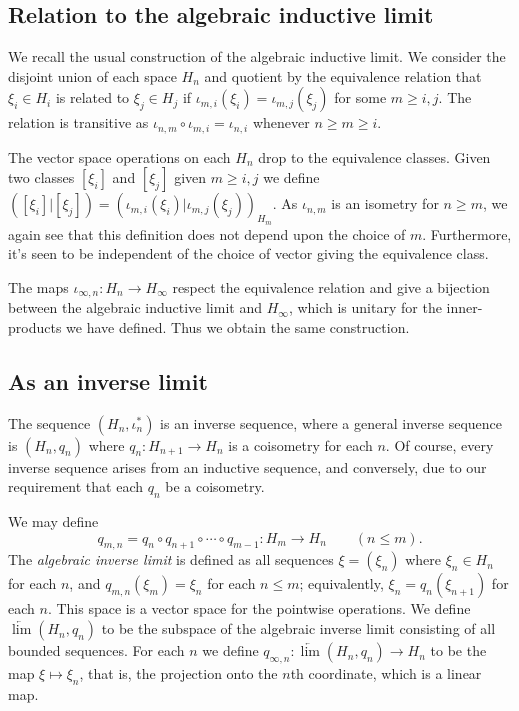 \documentclass[twoside,a4paper,12pt]{article}
\theoremstyle{plain}
\theoremstyle{definition}
\begin{document}
\subsection{Relation to the algebraic inductive limit}

We recall the usual construction of the algebraic inductive limit.  We consider the disjoint union of each space $H_n$ and quotient by the equivalence relation that $\xi_i\in H_i$ is related to $\xi_j\in H_j$ if $\iota_{m,i}(\xi_i) = \iota_{m,j}(\xi_j)$ for some $m\geq i,j$.  The relation is transitive as $\iota_{n,m}\circ\iota_{m,i} = \iota_{n,i}$ whenever $n \geq m \geq i$.

The vector space operations on each $H_n$ drop to the equivalence classes.  Given two classes $[\xi_i]$ and $[\xi_j]$ given $m\geq i,j$ we define $([\xi_i]|[\xi_j]) = (\iota_{m,i}(\xi_i)|\iota_{m,j}(\xi_j))_{H_m}$.  As $\iota_{n,m}$ is an isometry for $n\geq m$, we again see that this definition does not depend upon the choice of $m$.  Furthermore, it's seen to be independent of the choice of vector giving the equivalence class.

The maps $\iota_{\infty,n} \colon H_n \to H_\infty$ respect the equivalence relation and give a bijection between the algebraic inductive limit and $H_\infty$, which is unitary for the inner-products we have defined.  Thus we obtain the same construction.


\subsection{As an inverse limit}

The sequence $(H_n, \iota_n^*)$ is an inverse sequence, where a general inverse sequence is $(H_n, q_n)$ where $q_n\colon H_{n+1} \to H_n$ is a coisometry for each $n$.  Of course, every inverse sequence arises from an inductive sequence, and conversely, due to our requirement that each $q_n$ be a coisometry.

We may define
\[ q_{m,n} = q_n \circ q_{n+1} \circ\cdots\circ q_{m-1} \colon H_m \to H_n \qquad (n\leq m). \]
The \emph{algebraic inverse limit} is defined as all sequences $\xi = (\xi_n)$ where $\xi_n\in H_n$ for each $n$, and $q_{m,n}(\xi_m) = \xi_n$ for each $n\leq m$; equivalently, $\xi_n = q_n(\xi_{n+1})$ for each $n$.  This space is a vector space for the pointwise operations.
We define $\underleftarrow{\lim} (H_n, q_n)$ to be the subspace of the algebraic inverse limit consisting of all bounded sequences.
For each $n$ we define $q_{\infty,n} \colon \underleftarrow{\lim} (H_n, q_n) \to H_n$ to be the map $\xi \mapsto \xi_n$, that is, the projection onto the $n$th coordinate, which is a linear map.
\end{document}
